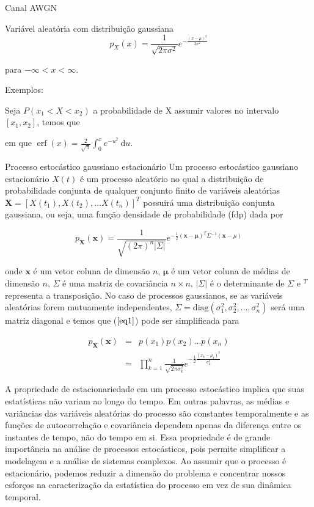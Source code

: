\documentclass[
  ignorenonframetext,
]{beamer}
\begin{document}
\begin{frame}{Canal AWGN}
\begin{block}{Variável aleatória com distribuição gaussiana}
\[
p_X\left(x\right)=\frac{1}{\sqrt{2 \pi \sigma^{2}}} e^{-\frac{(x-\mu)^{2}}{2 \sigma^{2}}}
\]

para \(-\infty <x < \infty\).

Exemplos:

Seja \(P(x_1 < X < x_2)\) a probabilidade de X assumir valores no
intervalo \([x_1, x_2]\), temos que

em que
\(\operatorname{erf}(x) =\frac{2}{\sqrt{\pi}} \int_0^x e^{-u^2} \mathrm{~d} u\).
\end{block}

\begin{block}{Processo estocástico gaussiano estacionário}
\label{processo-estocuxe1stico-gaussiano-estacionuxe1rio}
Um processo estocástico gaussiano estacionário \(X(t)\) é um processo
aleatório no qual a distribuição de probabilidade conjunta de qualquer
conjunto finito de variáveis aleatórias
\(\mathbf{X} = \left[X(t_1), X(t_2), \dots X(t_n) \right]^T\) possuirá
uma distribuição conjunta gaussiana, ou seja, uma função densidade de
probabilidade (fdp) dada por

\begin{equation} p_{\mathbf{X}}(\mathbf{x}) = \frac{1}{\sqrt{(2\pi)^n|\Sigma|}} e^{-\frac{1}{2} (\mathbf{x}-\mathbf{\mu})^T \Sigma^{-1} (\mathbf{x}-\mu)} \end{equation}\label{eq1}\]

onde \(\mathbf{x}\) é um vetor coluna de dimensão \(n\),
\(\mathbf{\mu}\) é um vetor coluna de médias de dimensão \(n\),
\(\Sigma\) é uma matriz de covariância \(n \times n\), \(|\Sigma|\) é o
determinante de \(\Sigma\) e \(^T\) representa a transposição. No caso
de processos gaussianos, se as variáveis aleatórias forem mutuamente
independentes,
\(\Sigma = \mathrm{diag}(\sigma_1^2, \sigma_2^2, \dots, \sigma_n^2)\)
será uma matriz diagonal e temos que (\(\ref{eq1}\)) pode ser
simplificada para

\begin{eqnarray} p_{\mathbf{X}}(\mathbf{x}) &=& p(x_1)p(x_2)\dots p(x_n) \\ &=&\prod_{k=1}^n \frac{1}{\sqrt{2\pi \sigma_k^2}} e^{-\frac{1}{2} \frac{(x_k-\mu_k)^2}{\sigma_k^2}} \end{eqnarray}\label{eq2}\]

A propriedade de estacionariedade em um processo estocástico implica que
suas estatísticas não variam ao longo do tempo. Em outras palavras, as
médias e variâncias das variáveis aleatórias do processo são constantes
temporalmente e as funções de autocorrelação e covariância dependem
apenas da diferença entre os instantes de tempo, não do tempo em si.
Essa propriedade é de grande importância na análise de processos
estocásticos, pois permite simplificar a modelagem e a análise de
sistemas complexos. Ao assumir que o processo é estacionário, podemos
reduzir a dimensão do problema e concentrar nossos esforços na
caracterização da estatística do processo em vez de sua dinâmica
temporal.
\end{block}


\end{frame}
\end{document}
